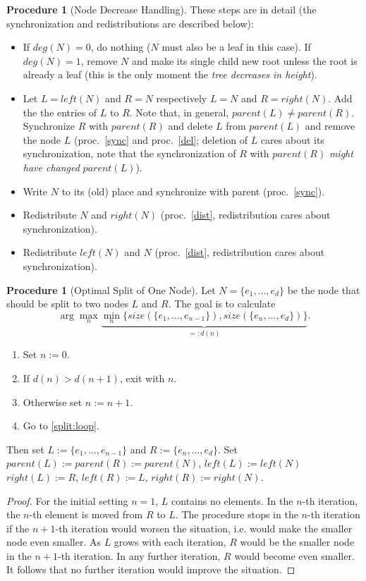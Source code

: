 \documentclass[a4paper, 8pt]{scrartcl}
\theoremstyle{plain}
\theoremstyle{definition}
\newtheorem{proc}[thm]{Procedure}
\theoremstyle{remark}
\begin{document}
\begin{multicols}{2}
\begin{proc}[Node Decrease Handling]
These steps are in detail (the synchronization and redistributions are 
described below):
\begin{itemize}
\item[ad 1:] If \mbox{$deg(N) = 0$}, do nothing ($N$ must also be a leaf in
	this case).
	If \mbox{$deg(N) = 1$}, remove $N$ and make its single child new root
	unless the root is already a leaf (this is the only moment the 
	{\em tree decreases in height}).
\item[ad 2+3:] Let \mbox{$L = left(N)$} and \mbox{$R = N$} respectively
	\mbox{$L = N$} and $R = right(N)$.
	Add the the entries of $L$ to $R$.
	Note that, in general, \mbox{$parent(L) \neq parent(R)$}.
	Synchronize $R$ with $parent(R)$ and delete $L$ from $parent(L)$
	and remove the node $L$ 
	(proc.~\ref{sync} and proc.~\ref{del}; deletion of $L$ cares about its
	synchronization, note that the synchronization of $R$ with $parent(R)$
	{\em might have changed} $parent(L)$).
\item[ad 4:] Write $N$ to its (old) place and synchronize with parent
	(proc.~\ref{sync}).
\item[ad 5:] Redistribute $N$ and $right(N)$ (proc.~\ref{dist},
	redistribution cares about synchronization).
\item[ad 6:] Redistribute $left(N)$ and $N$ (proc.~\ref{dist},
	redistribution cares about synchronization).
\end{itemize}
\end{proc}


\begin{proc}[Optimal Split of One Node] \label{split}
Let \mbox{$N = \{ e_1, \ldots, e_d \}$} be the node that should be split to
two nodes $L$ and $R$.
The goal is to calculate
\[ \arg \max_n \underbrace{\min_n \{ size(\{e_1, \ldots, e_{n-1}\}),
	size(\{e_n, \ldots, e_d\}) \}}_{=: d(n)}. \]
\begin{enumerate}
\item Set \mbox{$n := 0$}.
\item \label{split:loop} If \mbox{$d(n) > d(n+1)$}, exit with $n$.
\item Otherwise set \mbox{$n := n + 1$}. 
\item Go to \ref{split:loop}.
\end{enumerate}
Then set \mbox{$L := \{e_1, \ldots, e_{n-1}\}$}
and \mbox{$R := \{e_n, \ldots, e_d\}$}.
Set \mbox{$parent(L) := parent(R) := parent(N)$}, \mbox{$left(L) := left(N)$}
\mbox{$right(L) := R$}, \mbox{$left(R) := L$}, \mbox{$right(R) := right(N)$}.

\begin{proof}
For the initial setting $n = 1$, $L$ contains no elements.
In the $n$-th iteration, the $n$-th element is moved from $R$ to $L$.
The procedure stops in the $n$-th iteration if the $n+1$-th iteration would
worsen the situation, i.e. would make the smaller node even smaller.
As $L$ grows with each iteration, $R$ would be the smaller node in the
$n+1$-th iteration. In any further iteration, $R$ would become even smaller.
It follows that no further iteration would improve the situation.
\end{proof}
\end{proc}



\end{multicols}
\end{document}
